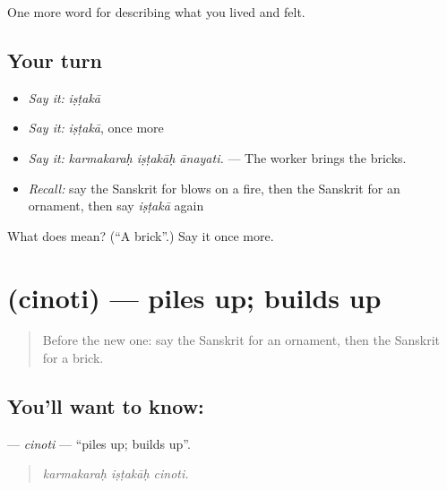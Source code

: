 \begin{grammarlens}[title={What you've built}]
One more word for describing what you lived and felt.
\end{grammarlens}

\subsection*{Your turn}
\begin{itemize}
\raggedright
  \item \emph{Say it:} \emph{iṣṭakā}
  \item \emph{Say it:} \emph{iṣṭakā}, once more
  \item \emph{Say it:} \emph{karmakaraḥ iṣṭakāḥ ānayati.} — The worker brings the bricks.
  \item \emph{Recall:} say the Sanskrit for blows on a fire, then the Sanskrit for an ornament, then say \emph{iṣṭakā} again
\end{itemize}

\begin{tcolorbox}[breakable,colback=teal!4,colframe=teal!35!black,title={Before you move on}]
What does  mean? (\textquotedblleft{}A brick\textquotedblright{}.) Say it once more.
\end{tcolorbox}
\section[\texorpdfstring{\sk{चिनोति} (cinoti)}{चिनोति (cinoti)}]{ (cinoti) — piles up; builds up}

\label{lesson:SA-C508-cinoti}



\begin{quote}
Before the new one: say the Sanskrit for an ornament, then the Sanskrit for a brick.
\end{quote}

\subsection*{You'll want to know: }
\textbf{} — \emph{cinoti} — \textquotedblleft{}piles up; builds up\textquotedblright{}.

\begin{quote}
  
\end{quote}

\begin{quote}
\emph{karmakaraḥ iṣṭakāḥ cinoti.}
\end{quote}

